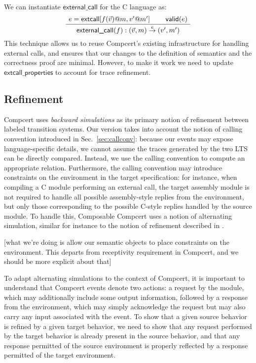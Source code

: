 \documentclass[sigplan,10pt,review,anonymous]{acmart}
\newcommand{\kw}[1]{\ensuremath{ \textsf{#1} }}
\begin{document}
We can instantiate $\kw{external\_call}$ for the C language as:
\[
  \AxiomC{$e = \kw{extcall}[f(\vec{v})@m, v'@m']$}
  \AxiomC{$\kw{valid}(e)$}
  \BinaryInfC{$\kw{external\_call}(f) :
    (\vec{v}, m) \stackrel{e}{\rightarrow} (v', m')$}
  \DisplayProof
\]
This technique allows us to reuse Compcert's existing infrastructure
for handling external calls,
and ensures that our changes to the
definition of semantics and the correctness proof are minimal.
However,
to make it work we need to update $\kw{extcall\_properties}$
to account for trace refinement.


\subsection{Refinement} %

Compcert uses \emph{backward simulations}
as its primary notion of refinement between labeled transition systems.
Our version takes into account the notion of calling convention
introduced in Sec.~\ref{sec:callconv}:
because our events may expose language-specific details,
we cannot assume the traces generated by the two LTS can be directly compared.
Instead,
we use the calling convention to compute an appropriate relation.
Furthermore,
the calling convention may introduce
constraints on the environment in the target specification:
for instance,
when compiling a C module performing an external call,
the target assembly module is not required to handle
all possible assembly-style replies from the environment,
but only those corresponding to the possible C-style replies
handled by the source module.
To handle this,
Composable Compcert uses a notion of alternating simulation,
similar for instance to the notion of refinement
described in \cite{gmos}.

[what we're doing
is allow our semantic objects
to place constraints on the environment.
This departs from receptivity requirement in Compcert,
and we should be more explicit about that]

To adapt alternating simulations to the context of Compcert,
it is important to understand that Compcert events
denote two actions:
a request by the module,
which may additionally include some output information,
followed by a response from the environment,
which may simply acknowledge the request
but may also carry any input associated with the event.
To show that
a given source behavior is refined by
a given target behavior,
we need to show that any request performed by the target behavior
is already present in the source behavior,
and that any response permitted of the source environment
is properly reflected by
a response permitted of the target environment.
\end{document}
